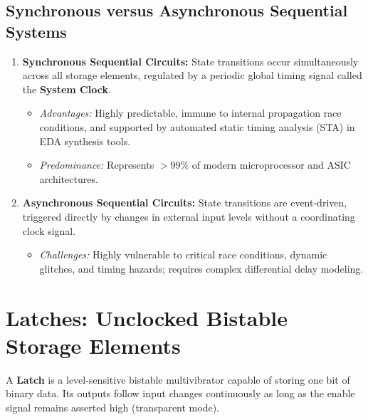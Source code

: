 \subsection{Synchronous versus Asynchronous Sequential Systems}
\begin{enumerate}[label=\bfseries\arabic*.]
    \item \textbf{Synchronous Sequential Circuits:} State transitions occur simultaneously across all storage elements, regulated by a periodic global timing signal called the \textbf{System Clock}.
    \begin{itemize}
        \item \textit{Advantages:} Highly predictable, immune to internal propagation race conditions, and supported by automated static timing analysis (STA) in EDA synthesis tools.
        \item \textit{Predominance:} Represents $>99\%$ of modern microprocessor and ASIC architectures.
    \end{itemize}
    \item \textbf{Asynchronous Sequential Circuits:} State transitions are event-driven, triggered directly by changes in external input levels without a coordinating clock signal.
    \begin{itemize}
        \item \textit{Challenges:} Highly vulnerable to critical race conditions, dynamic glitches, and timing hazards; requires complex differential delay modeling.
    \end{itemize}
\end{enumerate}


\section{Latches: Unclocked Bistable Storage Elements}
\label{sec:latches}

A \textbf{Latch} is a level-sensitive bistable multivibrator capable of storing one bit of binary data. Its outputs follow input changes continuously as long as the enable signal remains asserted high (transparent mode).

